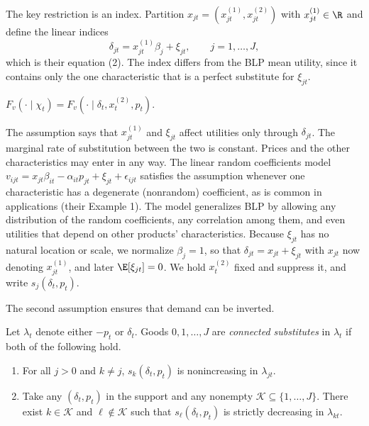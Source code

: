 The key restriction is an index. Partition $x_{jt} = (x^{(1)}_{jt}, x^{(2)}_{jt})$ with $x^{(1)}_{jt} \in \R$
and define the linear indices
\begin{equation*}
  \delta_{jt} = x^{(1)}_{jt}\beta_j + \xi_{jt}, \qquad j = 1, \dots, J,
\end{equation*}
which is their equation (2). The index differs from the BLP mean utility, since it contains only the one
characteristic that is a perfect substitute for $\xi_{jt}$.

\begin{assumption}\label{ass:08-bh-index}
$F_v(\cdot \mid \chi_t) = F_v(\cdot \mid \delta_t, x^{(2)}_t, p_t)$.
\end{assumption}

The assumption says that $x^{(1)}_{jt}$ and $\xi_{jt}$ affect utilities only through $\delta_{jt}$. The
marginal rate of substitution between the two is constant. Prices and the other characteristics may enter in
any way. The linear random coefficients model $v_{ijt} = x_{jt}\beta_{it} - \alpha_{it}p_{jt} + \xi_{jt} +
\epsilon_{ijt}$ satisfies the assumption whenever one characteristic has a degenerate (nonrandom) coefficient,
as is common in applications (their Example 1). The model generalizes BLP by allowing any distribution of the
random coefficients, any correlation among them, and even utilities that depend on other products'
characteristics. Because $\xi_{jt}$ has no natural location or scale, we normalize $\beta_j = 1$, so that
$\delta_{jt} = x_{jt} + \xi_{jt}$ with $x_{jt}$ now denoting $x^{(1)}_{jt}$, and later $\E[\xi_{jt}] = 0$. We
hold $x^{(2)}_t$ fixed and suppress it, and write $s_j(\delta_t, p_t)$.

The second assumption ensures that demand can be inverted.

\begin{definition}\label{def:08-connected}
Let $\lambda_t$ denote either $-p_t$ or $\delta_t$. Goods $0, 1, \dots, J$ are \emph{connected substitutes} in
$\lambda_t$ if both of the following hold.
\begin{enumerate}[label=(\roman*)]
  \item For all $j > 0$ and $k \neq j$, $s_k(\delta_t, p_t)$ is nonincreasing in $\lambda_{jt}$.
  \item Take any $(\delta_t, p_t)$ in the support and any nonempty $\mathcal{K} \subseteq \{1, \dots, J\}$.
  There exist $k \in \mathcal{K}$ and $\ell \notin \mathcal{K}$ such that $s_\ell(\delta_t, p_t)$ is strictly
  decreasing in $\lambda_{kt}$.
\end{enumerate}
\end{definition}

